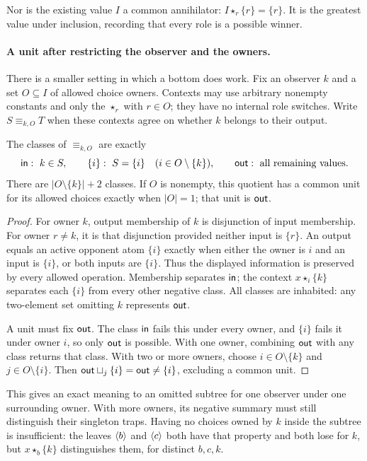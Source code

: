 Nor is the existing value $I$ a common annihilator:
$I\star_r\{r\}=\{r\}$. It is the greatest value under inclusion,
recording that every role is a possible winner.

\paragraph{A unit after restricting the observer and the owners.}
There is a smaller setting in which a bottom does work. Fix an observer
$k$ and a set $O\subseteq I$ of allowed choice owners. Contexts may
use arbitrary nonempty constants and only the $\star_r$ with $r\in O$;
they have no internal role switches. Write $S\equiv_{k,O}T$ when these
contexts agree on whether $k$ belongs to their output.

\begin{proposition}\label{context:prop:restricted-view}
The classes of $\equiv_{k,O}$ are exactly
\[
 \mathsf{in}:\ k\in S,\qquad
 \{i\}:\ S=\{i\}\quad(i\in O\setminus\{k\}),\qquad
 \mathsf{out}:\ \text{all remaining values}.
\]
There are $|O\setminus\{k\}|+2$ classes. If $O$ is nonempty, this
quotient has a common unit for its allowed choices exactly when
$|O|=1$; that unit is $\mathsf{out}$.
\end{proposition}
\begin{proof}
For owner $k$, output membership of $k$ is disjunction of input
membership. For owner $r\ne k$, it is that disjunction provided
neither input is $\{r\}$. An output equals an active opponent atom
$\{i\}$ exactly when either the owner is $i$ and an input is
$\{i\}$, or both inputs are $\{i\}$. Thus the displayed information
is preserved by every allowed operation. Membership separates $\mathsf{in}$;
the context $x\star_i\{k\}$ separates each $\{i\}$ from every other
negative class. All classes are inhabited: any two-element set omitting
$k$ represents $\mathsf{out}$.

A unit must fix $\mathsf{out}$. The class $\mathsf{in}$ fails this under every owner,
and $\{i\}$ fails it under owner $i$, so only $\mathsf{out}$ is possible. With
one owner, combining $\mathsf{out}$ with any class returns that class. With
two or more owners, choose $i\in O\setminus\{k\}$ and
$j\in O\setminus\{i\}$. Then
$\mathsf{out}\sqcup_j\{i\}=\mathsf{out}\ne\{i\}$, excluding a common unit.
\end{proof}

This gives an exact meaning to an omitted subtree for one observer
under one surrounding owner. With more owners, its negative summary
must still distinguish their singleton traps. Having no choices owned
by $k$ inside the subtree is insufficient: the leaves $\langle b\rangle$ and
$\langle c\rangle$ both have that property and both lose for $k$, but
$x\star_b\{k\}$ distinguishes them, for distinct $b,c,k$.

